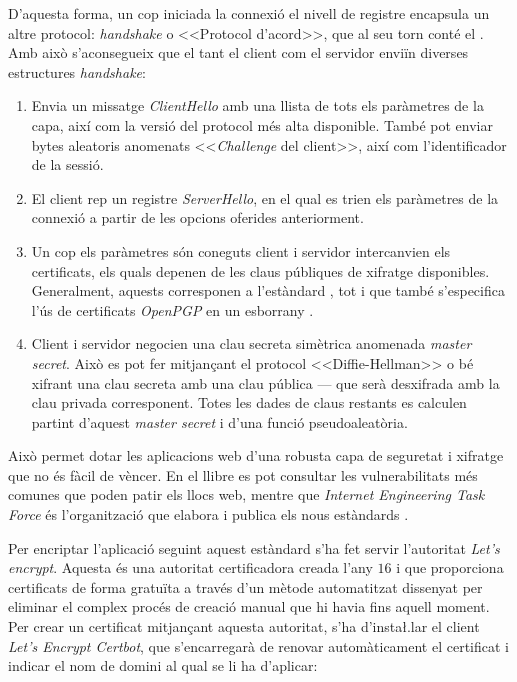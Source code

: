 \documentclass{tfgitic}[2022/06/30]
\begin{document}
D'aquesta forma, un cop iniciada la connexió el nivell de registre encapsula un altre protocol: \emph{handshake} o <<Protocol d'acord>>, que al seu torn conté el . Amb això s'aconsegueix que el tant el client com el servidor enviïn diverses estructures \emph{handshake}:

\begin{enumerate}
    \item Envia un missatge \emph{ClientHello} amb una llista de tots els paràmetres de la capa, així com la versió del protocol  més alta disponible. També pot enviar bytes aleatoris anomenats <<\emph{Challenge} del client>>, així com l'identificador de la sessió.
    \item El client rep un registre \emph{ServerHello}, en el qual es trien els paràmetres de la connexió a partir de les opcions oferides anteriorment.
    \item Un cop els paràmetres són coneguts client i servidor intercanvien els certificats, els quals depenen de les claus públiques de xifratge disponibles. Generalment, aquests corresponen a l'estàndard , tot i que també s'especifica l'ús de certificats \emph{OpenPGP} en un esborrany \cite{protocol:tls}.
    \item Client i servidor negocien una clau secreta simètrica anomenada \emph{master secret}. Això es pot fer mitjançant el protocol <<Diffie-Hellman>> o bé xifrant una clau secreta amb una clau pública --- que serà desxifrada amb la clau privada corresponent. Totes les dades de claus restants es calculen partint d'aquest \emph{master secret} i d'una funció pseudoaleatòria.
\end{enumerate}

Això permet dotar les aplicacions web d'una robusta capa de seguretat i xifratge que no és fàcil de vèncer. En el llibre \cite{security:compNet} es pot consultar les vulnerabilitats més comunes que poden patir els llocs web, mentre que \emph{Internet Engineering Task Force} és l'organització que elabora i publica els nous estàndards  \cite{protocol:tls}.

Per encriptar l'aplicació seguint aquest estàndard s'ha fet servir l'autoritat \emph{Let's encrypt}. Aquesta és una autoritat certificadora creada l'any $16$ i que proporciona certificats  de forma gratuïta a través d'un mètode automatitzat dissenyat per eliminar el complex procés de creació manual que hi havia fins aquell moment. Per crear un certificat  mitjançant aquesta autoritat, s'ha d'insta\l.lar  el client \emph{Let's Encrypt Certbot}, que s'encarregarà de renovar automàticament el certificat i indicar el nom de domini al qual se li ha d'aplicar:
\end{document}
